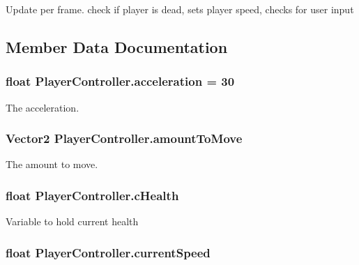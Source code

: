 Update per frame. check if player is dead, sets player speed, checks for user input 



\subsection{Member Data Documentation}
\hypertarget{classPlayerController_a421aa51bfbc7338f353ca84ea446de96}{
\subsubsection[{acceleration}]{\setlength{\rightskip}{0pt plus 5cm}float Player\-Controller.\-acceleration = 30}}\label{classPlayerController_a421aa51bfbc7338f353ca84ea446de96}


The acceleration. 

\hypertarget{classPlayerController_abdda9ecec7708206e6e01b1ead96f5c9}{
\subsubsection[{amount\-To\-Move}]{\setlength{\rightskip}{0pt plus 5cm}Vector2 Player\-Controller.\-amount\-To\-Move}}\label{classPlayerController_abdda9ecec7708206e6e01b1ead96f5c9}


The amount to move. 

\hypertarget{classPlayerController_a499b06bd0da8f827bba77d2778814ece}{
\subsubsection[{c\-Health}]{\setlength{\rightskip}{0pt plus 5cm}float Player\-Controller.\-c\-Health}}\label{classPlayerController_a499b06bd0da8f827bba77d2778814ece}


Variable to hold current health 

\hypertarget{classPlayerController_a015c55d3a7c7eed11bdec88c2fb81899}{
\subsubsection[{current\-Speed}]{\setlength{\rightskip}{0pt plus 5cm}float Player\-Controller.\-current\-Speed}}\label{classPlayerController_a015c55d3a7c7eed11bdec88c2fb81899}


